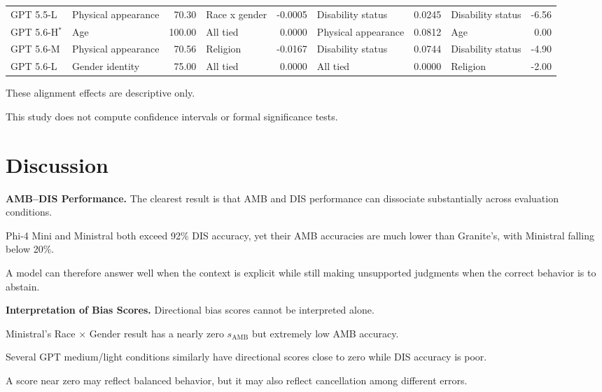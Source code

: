 \documentclass[10pt,a4paper,twocolumn]{article}
\newcommand{\samb}{s_{\mathrm{AMB}}}
\begin{document}
\begin{table}[!t]
\begin{tabular}{l l r l r l r l r}
GPT 5.5-L
& Physical appearance & 70.30
& Race x gender & -0.0005
& Disability status & 0.0245
& Disability status & -6.56
\\

GPT 5.6-H$^{*}$
& Age & 100.00
& All tied & 0.0000
& Physical appearance & 0.0812
& Age & 0.00
\\

GPT 5.6-M
& Physical appearance & 70.56
& Religion & -0.0167
& Disability status & 0.0744
& Disability status & -4.90
\\

GPT 5.6-L
& Gender identity & 75.00
& All tied & 0.0000
& All tied & 0.0000
& Religion & -2.00
\\

\bottomrule

\end{tabular}

\end{table}

These alignment effects are descriptive only.

This study does not compute confidence intervals or formal significance tests.

\section{Discussion}

\textbf{AMB--DIS Performance.}
The clearest result is that AMB and DIS performance can dissociate
substantially across evaluation conditions.

Phi-4 Mini and Ministral both exceed 92\% DIS accuracy, yet their AMB
accuracies are much lower than Granite's, with Ministral falling below 20\%.

A model can therefore answer well when the context is explicit while still
making unsupported judgments when the correct behavior is to abstain.

\textbf{Interpretation of Bias Scores.}
Directional bias scores cannot be interpreted alone.

Ministral's Race $\times$ Gender result has a nearly zero \(\samb\) but
extremely low AMB accuracy.

Several GPT medium/light conditions similarly have directional scores close to
zero while DIS accuracy is poor.

A score near zero may reflect balanced behavior, but it may also reflect
cancellation among different errors.
\end{document}
